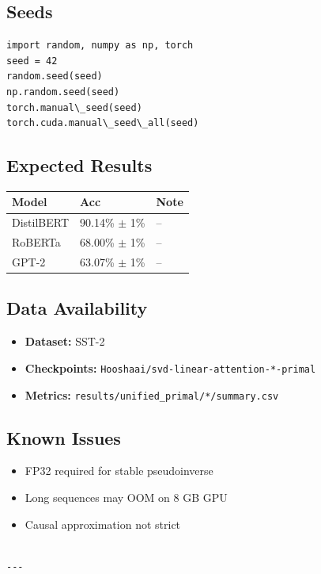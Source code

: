 \subsection{Seeds}

\begin{lstlisting}
import random, numpy as np, torch
seed = 42
random.seed(seed)
np.random.seed(seed)
torch.manual\_seed(seed)
torch.cuda.manual\_seed\_all(seed)
\end{lstlisting}

\subsection{Expected Results}

\begin{table}[H]
\centering
\small
\begin{tabular}{lll}
\toprule
\textbf{Model} & \textbf{Acc} & \textbf{Note} \\
\midrule
DistilBERT & 90.14\% $\pm$ 1\% & -- \\
RoBERTa & 68.00\% $\pm$ 1\% & -- \\
GPT-2 & 63.07\% $\pm$ 1\% & -- \\
\bottomrule
\end{tabular}
\end{table}

\subsection{Data Availability}

\begin{itemize}
\item \textbf{Dataset:} SST-2
\item \textbf{Checkpoints:} \texttt{Hooshaai/svd-linear-attention-*-primal}
\item \textbf{Metrics:} \texttt{results/unified\_primal/*/summary.csv}

\end{itemize}
\subsection{Known Issues}

\begin{itemize}
\item FP32 required for stable pseudoinverse
\item Long sequences may OOM on 8 GB GPU
\item Causal approximation not strict
\end{itemize}
\begin{lstlisting}

---
\end{lstlisting}